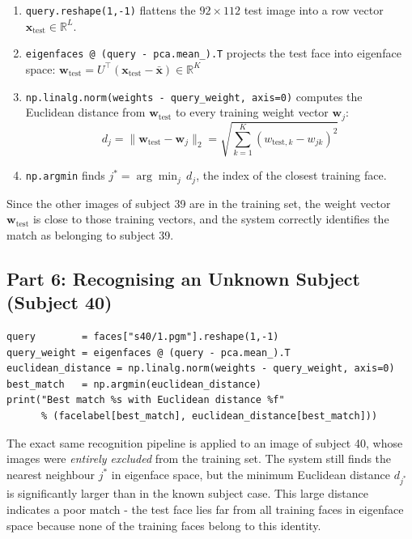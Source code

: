 \documentclass[12pt,a4paper]{article}
\begin{document}
\begin{enumerate}
    \item \texttt{query.reshape(1,-1)} flattens the $92 \times 112$ test image
          into a row vector $\mathbf{x}_{\text{test}} \in \mathbb{R}^L$.
    \item \texttt{eigenfaces @ (query - pca.mean\_).T} projects the test face
          into eigenface space:
          $\mathbf{w}_{\text{test}} = U^\top(\mathbf{x}_{\text{test}} - \bar{\mathbf{x}}) \in \mathbb{R}^K$
    \item \texttt{np.linalg.norm(weights - query\_weight, axis=0)} computes
          the Euclidean distance from $\mathbf{w}_{\text{test}}$ to every
          training weight vector $\mathbf{w}_j$:
          \[
          d_j = \|\mathbf{w}_{\text{test}} - \mathbf{w}_j\|_2
          = \sqrt{\sum_{k=1}^{K}(w_{\text{test},k} - w_{jk})^2}
          \]
    \item \texttt{np.argmin} finds $j^* = \arg\min_j\, d_j$, the index of
          the closest training face.
\end{enumerate}

Since the other images of subject 39 are in the training set, the weight
vector $\mathbf{w}_{\text{test}}$ is close to those training vectors, and the
system correctly identifies the match as belonging to subject 39.

\subsection{Part 6: Recognising an Unknown Subject (Subject 40)}

\begin{lstlisting}
query        = faces["s40/1.pgm"].reshape(1,-1)
query_weight = eigenfaces @ (query - pca.mean_).T
euclidean_distance = np.linalg.norm(weights - query_weight, axis=0)
best_match   = np.argmin(euclidean_distance)
print("Best match %s with Euclidean distance %f"
      % (facelabel[best_match], euclidean_distance[best_match]))
\end{lstlisting}

The exact same recognition pipeline is applied to an image of subject 40,
whose images were \textit{entirely excluded} from the training set. The system
still finds the nearest neighbour $j^*$ in eigenface space, but the minimum
Euclidean distance $d_{j^*}$ is significantly larger than in the known subject
case. This large distance indicates a poor match - the test face lies far
from all training faces in eigenface space because none of the training faces
belong to this identity.
\end{document}
